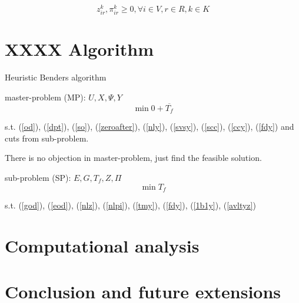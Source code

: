 \documentclass[preprint,12pt,authoryear]{elsarticle}
\begin{document}
\begin{equation}
    z_{ir}^k,\pi_{ir}^k\geq 0, \forall i\in V,r\in R,k\in K
\label{ddz}
\end{equation}


\section{XXXX Algorithm}

Heuristic Benders algorithm

master-problem (MP):
$U,X,\Psi,Y$
\begin{equation}
    \min 0+\overline{T_f}
\label{mobj}
\end{equation}

s.t. (\ref{od}), (\ref{dpt}), (\ref{so}), (\ref{zeroafter}), (\ref{nly}), 
(\ref{svsy}), (\ref{scc}), (\ref{ccy}), (\ref{fdy}) and cuts from sub-problem.

There is no objection in master-problem, just find the feasible solution.

sub-problem (SP):
$E,G,T_f,Z,\Pi$
\begin{equation}
    \min T_f
\label{sobj}
\end{equation}

s.t. (\ref{god}), (\ref{eod}), (\ref{nlz}), (\ref{nlpi}), (\ref{tmy}), (\ref{fdy}), (\ref{1b1y}), (\ref{avltyz})

\section{Computational analysis}

\section{Conclusion and future extensions}





\begin{thebibliography}{00}


\bibitem[ ()]{}

\end{thebibliography}
\end{document}
